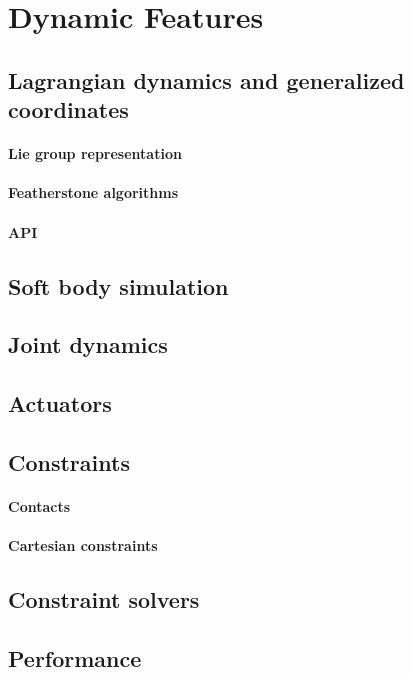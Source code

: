 \section{Dynamic Features}

\subsection{Lagrangian dynamics and generalized coordinates}
\paragraph{Lie group representation}
\paragraph{Featherstone algorithms}
\paragraph{API}

\subsection{Soft body simulation}

\subsection{Joint dynamics}

\subsection{Actuators}

\subsection{Constraints}
\paragraph{Contacts}
\paragraph{Cartesian constraints}

\subsection{Constraint solvers}

\subsection{Performance}

